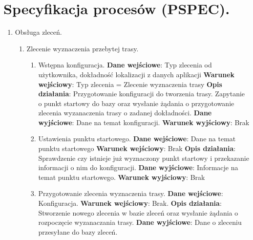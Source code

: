 \documentclass[11pt]{article}
\begin{document}
	\section{Specyfikacja procesów (PSPEC).}
	\begin{enumerate}
		\item Obsługa zleceń.
		\begin{enumerate}[label*=\arabic*.]
			\item Zlecenie wyznaczenia przebytej trasy.
			\begin{enumerate}[label*=\arabic*.]
				\item Wstępna konfiguracja. \newline
				\textbf{Dane wejściowe}: Typ zlecenia od użytkownika, dokładność lokalizacji z danych aplikacji	\newline
				\textbf{Warunek wejściowy}: Typ zlecenia = Zlecenie wyznaczenia trasy		\newline   	
				\textbf{Opis działania}: Przygotowanie konfiguracji do tworzenia trasy. Zapytanie o punkt startowy do bazy oraz wysłanie żądania o przygotowanie zlecenia wyzanaczenia trasy o zadanej dokładności.	\newline
				\textbf{Dane wyjściowe}: Dane na temat konfiguracji.	\newline
				\textbf{Warunek wyjściowy}: Brak
				\item Ustawienia punktu startowego. \newline
				\textbf{Dane wejściowe}: Dane na temat punktu startowego	\newline
				\textbf{Warunek wejściowy}: Brak		\newline   	
				\textbf{Opis działania}: Sprawdzenie czy istnieje już wyznaczony punkt startowy i przekazanie informacji o nim do konfiguracji.	\newline
				\textbf{Dane wyjściowe}: Informacje na temat punktu startowego.	\newline
				\textbf{Warunek wyjściowy}: Brak
				\item Przygotowanie zlecenia wyznaczenia trasy. \newline
				\textbf{Dane wejściowe}: Konfiguracja.	\newline
				\textbf{Warunek wejściowy}: Brak.		\newline   	
				\textbf{Opis działania}: Stworzenie nowego zlecenia w bazie zleceń oraz wysłanie żądania o rozpoczęcie wyzanaczania trasy.	\newline
				\textbf{Dane wyjściowe}: Dane o zleceniu przesyłane do bazy zleceń.	\newline

\end{enumerate}
\end{enumerate}
\end{enumerate}
\end{document}
